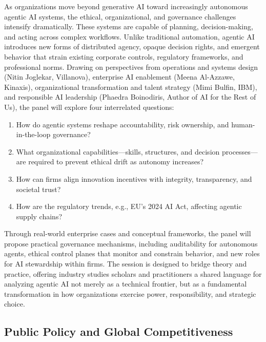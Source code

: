 \documentclass[
  10pt,
  letterpaper,
  DIV=11,
  numbers=noendperiod]{scrartcl}
\providecommand{\tightlist}{%
  \setlength{\itemsep}{0pt}\setlength{\parskip}{0pt}}\usepackage{longtable,booktabs,array}
\begin{document}
As organizations move beyond generative AI toward increasingly
autonomous agentic AI systems, the ethical, organizational, and
governance challenges intensify dramatically. These systems are capable
of planning, decision-making, and acting across complex workflows.
Unlike traditional automation, agentic AI introduces new forms of
distributed agency, opaque decision rights, and emergent behavior that
strain existing corporate controls, regulatory frameworks, and
professional norms. Drawing on perspectives from operations and systems
design (Nitin Joglekar, Villanova), enterprise AI enablement (Meena
Al-Azzawe, Kinaxis), organizational transformation and talent strategy
(Mimi Bulfin, IBM), and responsible AI leadership (Phaedra Boinodiris,
Author of AI for the Rest of Us), the panel will explore four
interrelated questions:

\begin{enumerate}
\def\labelenumi{(\arabic{enumi})}
\tightlist
\item
  How do agentic systems reshape accountability, risk ownership, and
  human-in-the-loop governance?
\item
  What organizational capabilities---skills, structures, and decision
  processes---are required to prevent ethical drift as autonomy
  increases?
\item
  How can firms align innovation incentives with integrity,
  transparency, and societal trust?\\
\item
  How are the regulatory trends, e.g., EU's 2024 AI Act, affecting
  agentic supply chains?
\end{enumerate}

Through real-world enterprise cases and conceptual frameworks, the panel
will propose practical governance mechanisms, including auditability for
autonomous agents, ethical control planes that monitor and constrain
behavior, and new roles for AI stewardship within firms. The session is
designed to bridge theory and practice, offering industry studies
scholars and practitioners a shared language for analyzing agentic AI
not merely as a technical frontier, but as a fundamental transformation
in how organizations exercise power, responsibility, and strategic
choice.

\subsection{\texorpdfstring{\textcolor{policy}{Public Policy and Global Competitiveness}}{}}\label{section-52}
\end{document}
